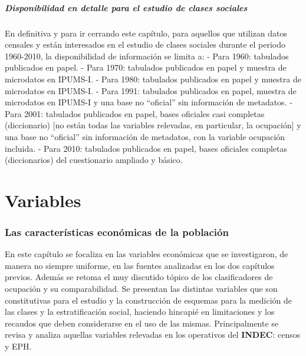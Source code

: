 \documentclass[
]{article}
\begin{document}
\hypertarget{disponibilidad-en-detalle-para-el-estudio-de-clases-sociales}{%
\subsubsection{Disponibilidad en detalle para el estudio de clases sociales}\label{disponibilidad-en-detalle-para-el-estudio-de-clases-sociales}}

En definitiva y para ir cerrando este capítulo, para aquellos que utilizan datos censales y están interesados en el estudio de clases sociales durante el periodo 1960-2010, la disponibilidad de información se limita a: - Para 1960: tabulados publicados en papel. - Para 1970: tabulados publicados en papel y muestra de microdatos en IPUMS-I. - Para 1980: tabulados publicados en papel y muestra de microdatos en IPUMS-I. - Para 1991: tabulados publicados en papel, muestra de microdatos en IPUMS-I y una base no ``oficial'' sin información de metadatos. - Para 2001: tabulados publicados en papel, bases oficiales casi completas (diccionario) {[}no están todas las variables relevadas, en particular, la ocupación{]} y una base no ``oficial'' sin información de metadatos, con la variable ocupación incluida. - Para 2010: tabulados publicados en papel, bases oficiales completas (diccionarios) del cuestionario ampliado y básico.

\hypertarget{part-variables}{%
\part{Variables}\label{part-variables}}

\hypertarget{ocupacion}{%
\section{Las características económicas de la población}\label{ocupacion}}

En este capítulo se focaliza en las variables económicas que se investigaron, de manera no siempre uniforme, en las fuentes analizadas en los dos capítulos previos. Además se retoma el muy discutido tópico de los clasificadores de ocupación y su comparabilidad. Se presentan las distintas variables que son constitutivas para el estudio y la construcción de esquemas para la medición de las clases y la estratificación social, haciendo hincapié en limitaciones y los recaudos que deben considerarse en el uso de las mismas. Principalmente se revisa y analiza aquellas variables relevadas en los operativos del \textbf{INDEC}: censos y EPH.
\end{document}
